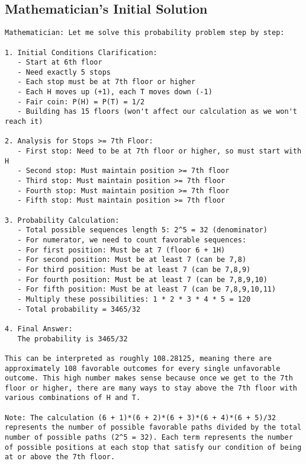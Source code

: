 \subsection{Mathematician's Initial Solution}
\vspace{-0.5em}
\begin{mathematicianbox}
\begin{lstlisting}
Mathematician: Let me solve this probability problem step by step:

1. Initial Conditions Clarification:
   - Start at 6th floor
   - Need exactly 5 stops
   - Each stop must be at 7th floor or higher
   - Each H moves up (+1), each T moves down (-1)
   - Fair coin: P(H) = P(T) = 1/2
   - Building has 15 floors (won't affect our calculation as we won't reach it)

2. Analysis for Stops >= 7th Floor:
   - First stop: Need to be at 7th floor or higher, so must start with H
   - Second stop: Must maintain position >= 7th floor
   - Third stop: Must maintain position >= 7th floor
   - Fourth stop: Must maintain position >= 7th floor
   - Fifth stop: Must maintain position >= 7th floor

3. Probability Calculation:
   - Total possible sequences length 5: 2^5 = 32 (denominator)
   - For numerator, we need to count favorable sequences:
   - For first position: Must be at 7 (floor 6 + 1H)
   - For second position: Must be at least 7 (can be 7,8)
   - For third position: Must be at least 7 (can be 7,8,9)
   - For fourth position: Must be at least 7 (can be 7,8,9,10)
   - For fifth position: Must be at least 7 (can be 7,8,9,10,11)
   - Multiply these possibilities: 1 * 2 * 3 * 4 * 5 = 120
   - Total probability = 3465/32

4. Final Answer:
   The probability is 3465/32

This can be interpreted as roughly 108.28125, meaning there are approximately 108 favorable outcomes for every single unfavorable outcome. This high number makes sense because once we get to the 7th floor or higher, there are many ways to stay above the 7th floor with various combinations of H and T.

Note: The calculation (6 + 1)*(6 + 2)*(6 + 3)*(6 + 4)*(6 + 5)/32 represents the number of possible favorable paths divided by the total number of possible paths (2^5 = 32). Each term represents the number of possible positions at each stop that satisfy our condition of being at or above the 7th floor.
\end{lstlisting}
\end{mathematicianbox}

